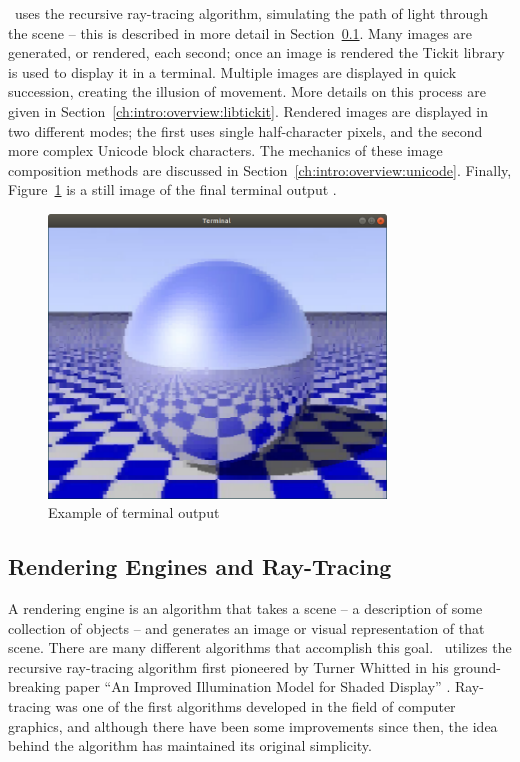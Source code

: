 \name\ uses the recursive ray-tracing algorithm, simulating the path of light through the scene -- this is described in more detail in Section~\ref{ch:intro:overview:raytracing}.
Many images are generated, or rendered, each second; once an image is rendered the Tickit library \cite{libtickitLibrary} is used to display it in a terminal.
Multiple images are displayed in quick succession, creating the illusion of movement.
More details on this process are given in Section~\ref{ch:intro:overview:libtickit}.
Rendered images are displayed in two different modes; the first uses single half-character pixels, and the second more complex Unicode block characters.
The mechanics of these image composition methods are discussed in Section~\ref{ch:intro:overview:unicode}.
Finally, Figure~\ref{fig:checker_metal} is a still image of the final terminal output .

\begin{figure}[htb]
  \centering
  \includegraphics[width=0.8\textwidth]{resources/checker_metal}
  \caption{Example of terminal output}
  \label{fig:checker_metal}
\end{figure}

\subsection{Rendering Engines and Ray-Tracing}
\label{ch:intro:overview:raytracing}

A rendering engine is an algorithm that takes a scene -- a description of some collection of objects -- and generates an image or visual representation of that scene.
There are many different algorithms that accomplish this goal.
\name\ utilizes the recursive ray-tracing algorithm first pioneered by Turner Whitted in his ground-breaking paper ``An Improved Illumination Model for Shaded Display'' \cite{whitted1980improved}.
Ray-tracing was one of the first algorithms developed in the field of computer graphics, and although there have been some improvements since then, the idea behind the algorithm has maintained its original simplicity.

